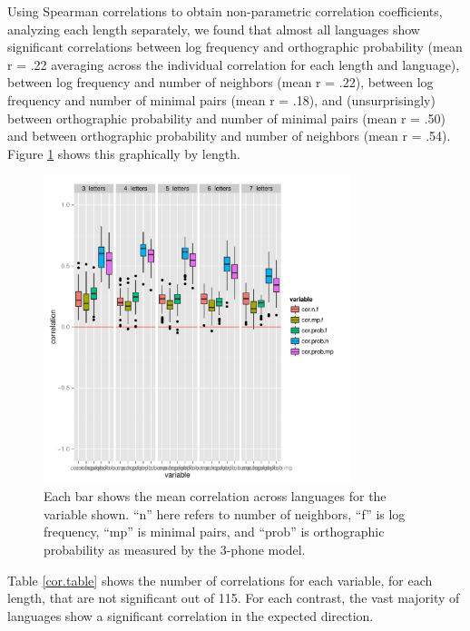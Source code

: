 \documentclass{article}
\begin{document}
Using Spearman correlations to obtain non-parametric correlation coefficients, analyzing
each length separately, we found
that almost all languages show significant correlations between log frequency and orthographic probability
(mean r = .22 averaging across the individual correlation for each length and language),
between log frequency and number of neighbors (mean r = .22), between log frequency and number of minimal
pairs (mean r = .18), and
(unsurprisingly) between orthographic probability and number of minimal pairs (mean r = .50) and between orthographic
probability and number of neighbors (mean r = .54). Figure \ref{cor.test} shows this graphically by length.

\begin{figure}[htbp]
  \centering
  \includegraphics[width=0.8\textwidth]{PDFs/violins_of_stats.pdf}
  \caption{Each bar shows the mean correlation across languages for the variable shown. ``n'' here refers to
    number of neighbors, ``f'' is log frequency, ``mp'' is minimal pairs, and ``prob'' is orthographic
    probability as measured by the 3-phone model.}
  \label{cor.test}
\end{figure}


Table \ref{cor.table} shows the number of correlations for each variable, for each length, that are not
significant out of 115. For each contrast, the vast majority of languages show a significant correlation in
the expected direction.
\end{document}

